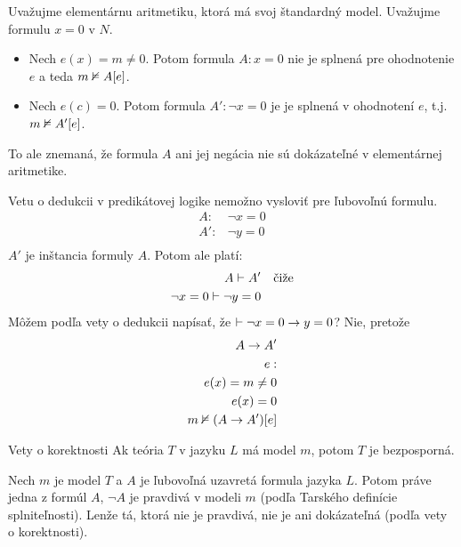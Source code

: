 \begin{priklad} %
    Uvažujme elementárnu aritmetiku, ktorá má svoj štandardný
    model. Uvažujme formulu $x=0$ v $N$.
    \begin{itemize}
        \item Nech $e(x) = m \neq 0$. Potom formula $A: x=0$ nie je
        splnená pre ohodnotenie $e$ a teda $m \nvDash A[e]$.
        \item Nech $e(c) = 0$. Potom formula $A': \neg x=0$ je je
        splnená v ohodnotení $e$, t.j. $m \nvDash A'[e]$.
    \end{itemize}
    To ale znemaná, že formula $A$ ani jej negácia
    nie sú dokázateľné v elementárnej aritmetike.
\end{priklad}


\begin{poznamka} %
    Vetu o dedukcii v predikátovej logike nemožno vysloviť pre
    ľubovoľnú formulu.
    \begin{align*}
            A: & \neg x=0 \\
            A': & \neg y=0 \\
    \end{align*}
    $A'$ je inštancia formuly $A$. Potom ale platí:
    \begin{align*}
            A \vdash A' & \quad \mbox{čiže}\\
            \neg x=0 \vdash \neg y=0
    \end{align*}
    Môžem podľa vety o dedukcii napísať, že 
    $\vdash \neg x=0 \rightarrow y=0$? Nie, pretože
    \begin{align*}
        A \rightarrow A' \\
        e: \\
        e(x)= m \neq 0 \\
        e(x)= 0 \\
        m \nvDash (A \rightarrow A')[e]
    \end{align*}
\end{poznamka}

\begin{dosledok}{Vety o korektnosti}
    Ak teória $T$ v jazyku $L$ má model $m$, potom $T$ je
    bezposporná.
\end{dosledok}
\begin{dokaz}
    Nech $m$ je model $T$ a $A$ je ľubovoľná uzavretá formula jazyka $L$.
    Potom práve jedna z formúl $A$, $\neg A$ je pravdivá v modeli $m$
    (podľa Tarského definície splniteľnosti).
    Lenže tá, ktorá nie je pravdivá, nie je ani dokázateľná 
    (podľa vety o korektnosti).
\end{dokaz}

